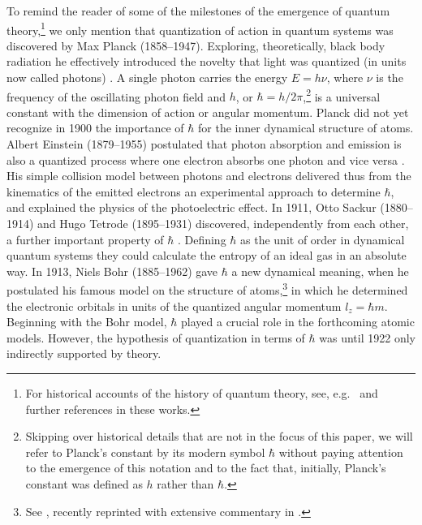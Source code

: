 \documentclass[12pt]{article}
\begin{document}
To remind the reader of some of the milestones of the emergence of quantum theory,\footnote{For historical accounts of the history of quantum theory, see, e.g.\  \citep{KuhnT1978Theory, MehraJEtAl1982Development1,DarrigolO1992From,KraghH2012Bohr} and further references in these works.} we only mention that quantization of action in quantum systems was discovered by Max Planck (1858--1947). Exploring, theoretically, black body radiation he effectively introduced the novelty that light was quantized (in units now called photons) \citep{PlanckM1899Strahlungsvorgaenge}. A single photon carries the energy $E = h\nu$, where $\nu$ is the frequency of the oscillating photon field and $h$, or $\hbar = h/2\pi$,\footnote{Skipping over historical details that are not in the focus of this paper, we will refer to Planck's constant by its modern symbol $\hbar$ without paying attention to the emergence of this notation and to the fact that, initially, Planck's constant was defined as $h$ rather than $\hbar$.} is a universal constant with the dimension of action or angular momentum. Planck did not yet recognize in 1900 the importance of $\hbar$ for the inner dynamical structure of atoms. Albert Einstein (1879--1955) postulated that photon absorption and emission is also a quantized process where one electron absorbs one photon and vice versa \citep{Einstein1905i}. His simple collision model between photons and electrons delivered thus from the kinematics of the emitted electrons an experimental approach to determine $\hbar$, and explained the physics of the photoelectric effect. In 1911, Otto Sackur (1880--1914) and Hugo Tetrode (1895--1931) discovered, independently from each other, a further important property of $\hbar$ \citep{SackurO1912Anwendung,SackurO1913Bedeutung,TetrodeH1912Konstante1,TetrodeH1912Konstante2}. Defining $\hbar$ as the unit of order in dynamical quantum systems they could calculate the entropy of an ideal gas in an absolute way. In 1913, Niels Bohr (1885--1962) gave $\hbar$ a new dynamical meaning, when he postulated his famous model on the structure of atoms,\footnote{See \citep{BohrN1913Constitution1,BohrN1913Constitution2,BohrN1913Constitution3}, recently reprinted with extensive commentary in  \citep{AaserudFEtal2013Love}.} in which he determined the electronic orbitals in units of the quantized angular momentum $l_z=\hbar m$. Beginning with the Bohr model, $\hbar$ played a crucial role in the forthcoming atomic models. However, the hypothesis of quantization in terms of $\hbar$ was until 1922 only indirectly supported by theory.
\end{document}
